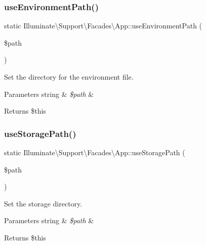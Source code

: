 \subsubsection{\texorpdfstring{use\+Environment\+Path()}{useEnvironmentPath()}}
{\footnotesize\ttfamily static Illuminate\textbackslash{}\+Support\textbackslash{}\+Facades\textbackslash{}\+App\+::use\+Environment\+Path (\begin{DoxyParamCaption}\item[{}]{\$path }\end{DoxyParamCaption})\hspace{0.3cm}{\ttfamily [static]}}

Set the directory for the environment file.


\begin{DoxyParams}[1]{Parameters}
string & {\em \$path} & \\
\hline
\end{DoxyParams}
\begin{DoxyReturn}{Returns}
\$this 
\end{DoxyReturn}
\mbox{\label{class_illuminate_1_1_support_1_1_facades_1_1_app_ad31a72f91f6c5f3ed45971f3885aa1a8}} 
\subsubsection{\texorpdfstring{use\+Storage\+Path()}{useStoragePath()}}
{\footnotesize\ttfamily static Illuminate\textbackslash{}\+Support\textbackslash{}\+Facades\textbackslash{}\+App\+::use\+Storage\+Path (\begin{DoxyParamCaption}\item[{}]{\$path }\end{DoxyParamCaption})\hspace{0.3cm}{\ttfamily [static]}}

Set the storage directory.


\begin{DoxyParams}[1]{Parameters}
string & {\em \$path} & \\
\hline
\end{DoxyParams}
\begin{DoxyReturn}{Returns}
\$this 
\end{DoxyReturn}
\mbox{\label{class_illuminate_1_1_support_1_1_facades_1_1_app_af1d0616b31932a0e645e6264578a0243}} 
